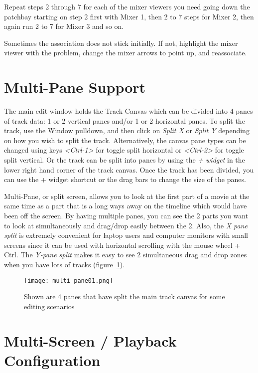 Repeat steps 2 through 7 for each of the mixer viewers you need going down the patchbay starting on step 2 first with Mixer 1, then 2 to 7 steps for Mixer 2, then again run 2 to 7 for Mixer 3 and so on.

Sometimes the association does not stick initially.  If not, highlight the mixer viewer with the problem, change the mixer arrows to point up, and reassociate.

\section{Multi-Pane Support}%
\label{sec:multipane_support}

The main \CGG{} edit window holds the Track Canvas which can be divided into 4 panes of track data: 1 or 2 vertical panes and/or 1 or 2 horizontal panes.  To split the track, use the Window pulldown, and then click on \textit{Split X} or \textit{Split Y} depending on how you wish to split the track.  Alternatively, the canvas pane types can be changed using keys \textit{<Ctrl-1>} for toggle split horizontal or \textit{<Ctrl-2>} for toggle split vertical.  Or the track can be split into panes by using the \textit{+ widget} in the lower right hand corner of the track canvas.  Once the track has been divided, you can use the + widget shortcut or the drag bars to change the size of the panes.

Multi-Pane, or split screen, allows you to look at the first part of a movie at the same time as a part that is a long ways away on the timeline which would have been off the screen.  By having multiple panes, you can see the 2 parts you want to look at simultaneously and drag/drop easily between the 2.  Also, the \textit{X pane split} is extremely convenient for laptop users and computer monitors with small screens since it can be used with horizontal scrolling with the mouse wheel + Ctrl.  The \textit{Y-pane split} makes it easy to see 2 simultaneous drag and drop zones when you have lots of tracks (figure~\ref{fig:multi-pane01}).

\begin{figure}[htpb]
    \centering
    \texttt{[image: multi-pane01.png]}
    \caption{Shown are 4 panes that have split the main track canvas for some editing scenarios}
    \label{fig:multi-pane01}
\end{figure}

\section{Multi-Screen / Playback Configuration}%
\label{sec:multiscreen_playback_configuration}

